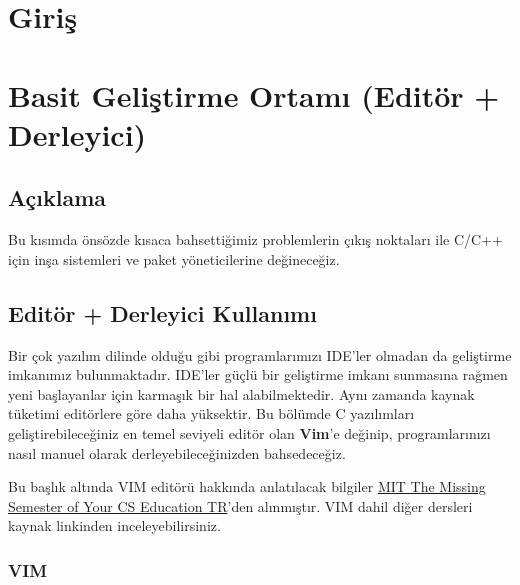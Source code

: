 \documentclass[
]{book}
\begin{document}
\hypertarget{giriux15f}{%
\chapter*{Giriş}\label{giriux15f}}

\hypertarget{basit-geliux15ftirme-ortamux131-edituxf6r-derleyici}{%
\chapter*{Basit Geliştirme Ortamı (Editör + Derleyici)}\label{basit-geliux15ftirme-ortamux131-edituxf6r-derleyici}}

\hypertarget{auxe7ux131klama}{%
\section*{Açıklama}\label{auxe7ux131klama}}

Bu kısımda önsözde kısaca bahsettiğimiz problemlerin çıkış noktaları ile C/C++ için inşa sistemleri ve paket yöneticilerine değineceğiz.

\hypertarget{edituxf6r-derleyici-kullanux131mux131}{%
\section*{Editör + Derleyici Kullanımı}\label{edituxf6r-derleyici-kullanux131mux131}}

Bir çok yazılım dilinde olduğu gibi programlarımızı IDE'ler olmadan da geliştirme imkanımız bulunmaktadır. IDE'ler güçlü bir geliştirme imkanı sunmasına rağmen yeni başlayanlar için karmaşık bir hal alabilmektedir. Aynı zamanda kaynak tüketimi editörlere göre daha yüksektir. Bu bölümde C yazılımları geliştirebileceğiniz en temel seviyeli editör olan \textbf{Vim}'e değinip, programlarınızı nasıl manuel olarak derleyebileceğinizden bahsedeceğiz.

Bu başlık altında VIM editörü hakkında anlatılacak bilgiler \href{https://missing-semester-tr.github.io/}{MIT \textbar{} The Missing Semester of Your CS Education TR}'den alınmıştır. VIM dahil diğer dersleri kaynak linkinden inceleyebilirsiniz.

\hypertarget{vim}{%
\subsection*{VIM}\label{vim}}
\end{document}
